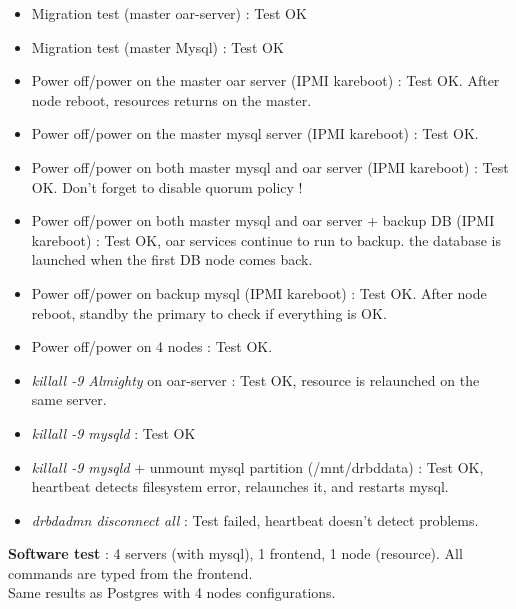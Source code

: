 \documentclass[a4paper,10pt]{report}
\begin{document}
\begin{itemize}
 \item Migration test (master oar-server) : Test OK
 \item Migration test (master Mysql) : Test OK
 \item Power off/power on the master oar server (IPMI kareboot) : Test OK. After node reboot, resources returns on the master.
 \item Power off/power on the master mysql server (IPMI kareboot) : Test OK.
 \item Power off/power on both master mysql and oar server (IPMI kareboot) : Test OK. Don't forget to disable quorum policy !
 \item Power off/power on both master mysql and oar server + backup DB (IPMI kareboot) : Test OK, oar services continue to run to backup. the database is launched when the first DB node comes back.
 \item Power off/power on backup mysql (IPMI kareboot) : Test OK. After node reboot, standby the primary to check if everything is OK.
 \item Power off/power on 4 nodes : Test OK.
 \item \textit{killall -9 Almighty} on oar-server : Test OK, resource is relaunched on the same server.
 \item \textit{killall -9 mysqld} : Test OK
 \item \textit{killall -9 mysqld} + unmount mysql partition (/mnt/drbddata) : Test OK, heartbeat detects filesystem error, relaunches it, and restarts mysql.
 \item \textit{drbdadmn disconnect all} : Test failed, heartbeat doesn't detect problems.
\end{itemize}

\textbf{Software test} : 4 servers (with mysql), 1 frontend, 1 node (resource). All commands are typed from the frontend.\\
Same results as Postgres with 4 nodes configurations.


















\appendix
\end{document}
